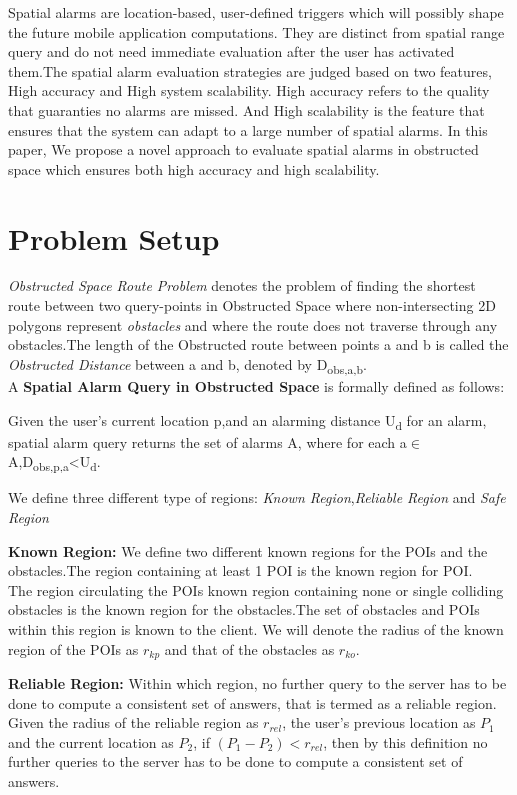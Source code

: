 \documentclass{sig-alternate}
\begin{document}
Spatial alarms are location-based, user-defined triggers which will possibly shape the future mobile application computations. They are distinct from spatial range query and do not need immediate evaluation after the user has activated them.The spatial alarm evaluation strategies are judged based on two features, High accuracy and High system scalability. High accuracy refers to the quality that guaranties no alarms are missed. And High scalability is the feature that ensures that the system can adapt to a large number of spatial alarms.
In this paper, We propose a novel approach to evaluate spatial alarms in obstructed space which ensures both high accuracy and high scalability.
\section{Problem Setup}
\textit{Obstructed Space Route Problem} denotes the problem of finding the shortest route between two query-points  in Obstructed Space where non-intersecting 2D polygons represent \textit{obstacles} and where the route does not traverse through any obstacles.The length of the Obstructed route between points a and b is called the \textit{Obstructed Distance} between a and b, denoted by D\textsubscript{obs,a,b}.\\
A \textbf{Spatial Alarm Query in Obstructed Space} is formally defined as follows:
\begin{defn}
Given the user's current location p,and an alarming distance U\textsubscript{d} for an alarm, spatial alarm query returns the set of alarms A, where for each a$\in$ A,D\textsubscript{obs,p,a}<U\textsubscript{d}. 
\end{defn}
We define three different type of regions: \textit{Known Region},\textit{Reliable Region} and \textit{Safe Region}

\begin{defn} 
\textbf{Known Region:} We define two different known regions for the POIs and the obstacles.The region containing at least 1 POI is the known region for POI.\\
The region circulating the POIs known region containing none or single colliding obstacles is the known region for the obstacles.The set of obstacles and POIs within this region is known to the client. 
We will denote the radius of the known region of the POIs as $r_{kp}$ and that of the obstacles as $r_{ko}$.
\end{defn}

\begin{defn}
\textbf{Reliable Region:} Within which region, no further query to the server has to be done to compute a consistent set of answers, that is termed as a reliable region. Given the radius of the reliable region as $r_{rel}$, the user's previous location as $P_1$ and the current location as $P_2$, if $(P_1 - P_2) < r_{rel}$, then by this definition no further queries to the server has to be done to compute a consistent set of answers.
\end{defn}
\end{document}
